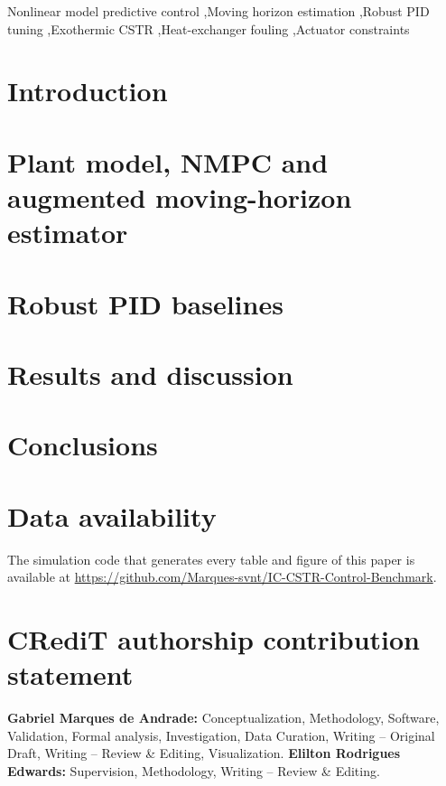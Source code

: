 \documentclass[a4paper,fleqn]{cas-dc}
\begin{document}


\begin{keywords}
Nonlinear model predictive control \sep Moving horizon estimation \sep Robust PID tuning \sep Exothermic CSTR \sep Heat-exchanger fouling \sep Actuator constraints
\end{keywords}

\maketitle

\section{Introduction}
\label{sec:introduction}


\section{Plant model, NMPC and augmented moving-horizon estimator}
\label{sec:formulation}


\section{Robust PID baselines}
\label{sec:baselines}


\section{Results and discussion}
\label{sec:results}


\section{Conclusions}
\label{sec:conclusion}


\section*{Data availability}
The simulation code that generates every table and figure of this paper is available at \url{https://github.com/Marques-svnt/IC-CSTR-Control-Benchmark}.

\section*{CRediT authorship contribution statement}
{\sloppy\setlength{\emergencystretch}{3em}\textbf{Gabriel Marques de Andrade:} Conceptualization, Methodology, Software, Validation, Formal analysis, Investigation, Data Curation, Writing -- Original Draft, Writing -- Review \& Editing, Visualization. \textbf{Elilton Rodrigues Edwards:} Supervision, Methodology, Writing -- Review \& Editing.\par}
\end{document}
